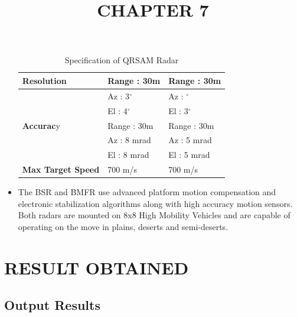 \documentclass[14pt]{article} %
\begin{document}
\begin{itemize}
\begin{table}
{\begin{tabular}{p{}p{}p{}}
\textbf{Resolution} & Range : 30m& Range : 30m\\ \midrule
&Az   : 3$^{\circ}$ & Az    : $^{\circ}$\\
&El     : 4$^{\circ}$ & El     : 3$^{\circ}$\\ \midrule
\textbf{Accurac}y & Range : 30m & Range : 30m\\ 
&Az     : 8 mrad & Az      : 5 mrad\\
&El       : 8 mrad & El       : 5 mrad\\  \midrule
\textbf{Max Target Speed} & 700 m/s & 700 m/s\\ \bottomrule
\end{tabular}}
\caption{Specification of QRSAM Radar}
\end{table}

\item The BSR and BMFR use advanced platform motion compensation and electronic stabilization algorithms along with high accuracy motion sensors. Both radars are mounted on 8x8 High Mobility Vehicles and are capable of operating on the move in plains, deserts and semi-deserts.
\end{itemize}

\pagebreak

\title{CHAPTER 7}
\maketitle
\section{RESULT OBTAINED}
\subsection{Output Results}
\end{document}
